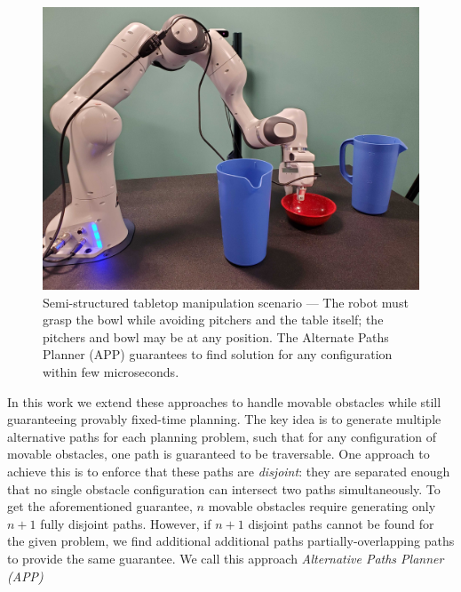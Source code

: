 \documentclass[a4paper]{report}
\begin{document}
\begin{figure}[bt]
\centering
\includegraphics[width=\columnwidth]{figs/cover.jpg}
\caption{Semi-structured tabletop manipulation scenario --- The robot must grasp the bowl while avoiding pitchers and the table itself; the pitchers and bowl may be at any position. The Alternate Paths Planner (APP) guarantees to find solution for any configuration within few microseconds.}
\label{fig:cover}
\vskip -0.5cm
\end{figure}

In this work we extend these approaches to handle movable obstacles while still guaranteeing provably fixed-time planning.
The key idea is to generate multiple alternative paths for each planning problem, such that for any configuration of movable obstacles, one path is guaranteed to be traversable.
One approach to achieve this is to enforce %
that these paths are \emph{disjoint}: they are separated enough that no single obstacle configuration can intersect two paths simultaneously.
To get the aforementioned guarantee, $n$ movable obstacles require generating only $n+1$ fully disjoint paths.
However, if $n+1$ disjoint paths cannot be found for the given problem, we find additional additional paths partially-overlapping paths to provide the same guarantee.
We call this approach \emph{Alternative Paths Planner (APP)}
\end{document}
